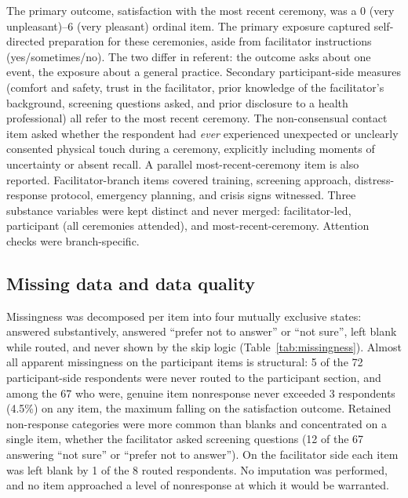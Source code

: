 \documentclass[12pt]{article}
\begin{document}
The primary outcome, satisfaction with the most recent ceremony, was a 0 (very unpleasant)--6 (very
pleasant) ordinal item. The primary exposure captured self-directed preparation for these ceremonies, aside
from facilitator instructions (yes/sometimes/no). The two differ in referent: the outcome asks about one
event, the exposure about a general practice. Secondary participant-side measures (comfort and safety,
trust in the facilitator, prior knowledge of the facilitator's background, screening questions asked, and
prior disclosure to a health professional) all refer to the most recent ceremony. The non-consensual contact
item asked whether the respondent had \emph{ever} experienced unexpected or unclearly consented physical
touch during a ceremony, explicitly including moments of uncertainty or absent recall. A parallel
most-recent-ceremony item is also reported. Facilitator-branch items covered training, screening approach,
distress-response protocol, emergency planning, and crisis signs witnessed. Three substance variables were
kept distinct and never merged: facilitator-led, participant (all ceremonies attended), and
most-recent-ceremony. Attention checks were branch-specific.

\subsection{Missing data and data quality}

Missingness was decomposed per item into four mutually exclusive states: answered substantively, answered
``prefer not to answer'' or ``not sure'', left blank while routed, and never shown by the skip
logic (Table~\ref{tab:missingness}). Almost all apparent missingness on the participant items is structural:
5 of the 72 participant-side respondents were never routed to the participant section, and among the 67 who
were, genuine item nonresponse never exceeded 3 respondents (4.5\%) on any item, the maximum falling on the
satisfaction outcome. Retained non-response categories were more common than blanks and concentrated on a
single item, whether the facilitator asked screening questions (12 of the 67 answering ``not sure'' or
``prefer not to answer''). On the facilitator side each item was left blank by 1 of the 8 routed
respondents. No imputation was performed, and no item approached a level of nonresponse at which it would be
warranted.
\end{document}
